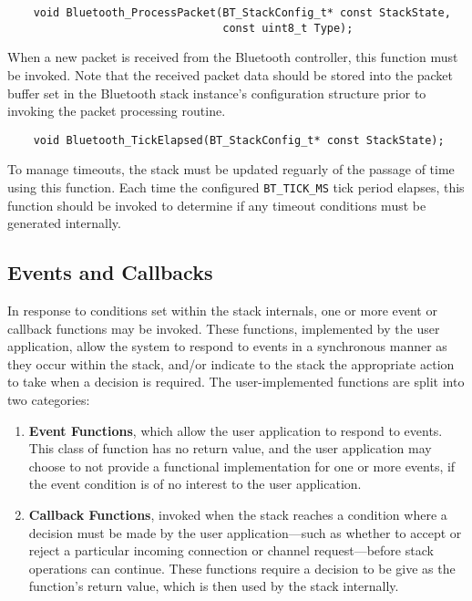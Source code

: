 \vspace{1em}
\begin{lstlisting}
	void Bluetooth_ProcessPacket(BT_StackConfig_t* const StackState,
	                             const uint8_t Type);
\end{lstlisting}

When a new packet is received from the Bluetooth controller, this function must be invoked. Note that the received packet data should be stored into the packet buffer set in the Bluetooth stack instance's configuration structure prior to invoking the packet processing routine.

\vspace{1em}
\begin{lstlisting}
	void Bluetooth_TickElapsed(BT_StackConfig_t* const StackState);
\end{lstlisting}

To manage timeouts, the stack must be updated reguarly of the passage of time using this function. Each time the configured \lstinline{BT_TICK_MS} tick period elapses, this function should be invoked to determine if any timeout conditions must be generated internally.

\FloatBarrier
\subsection{Events and Callbacks}

In response to conditions set within the stack internals, one or more event or callback functions may be invoked. These functions, implemented by the user application, allow the system to respond to events in a synchronous manner as they occur within the stack, and/or indicate to the stack the appropriate action to take when a decision is required. The user-implemented functions are split into two categories:

\begin{enumerate}
	\item \textbf{Event Functions}, which allow the user application to respond to events. This class of function has no return value, and the user application may choose to not provide a functional implementation for one or more events, if the event condition is of no interest to the user application.
	\item \textbf{Callback Functions}, invoked when the stack reaches a condition where a decision must be made by the user application---such as whether to accept or reject a particular incoming connection or channel request---before stack operations can continue. These functions require a decision to be give as the function's return value, which is then used by the stack internally.
\end{enumerate}

